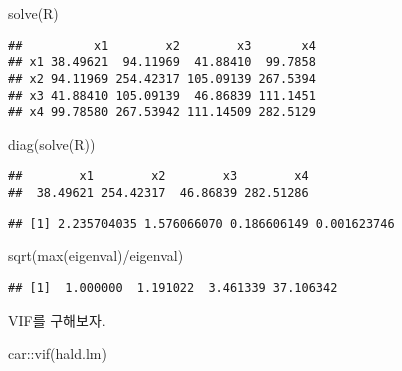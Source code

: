 \documentclass[
]{book}
\newenvironment{Shaded}{\begin{snugshade}}{\end{snugshade}}
\newcommand{\FunctionTok}[1]{\textcolor[rgb]{0.00,0.00,0.00}{#1}}
\newcommand{\NormalTok}[1]{#1}
\newcommand{\OtherTok}[1]{\textcolor[rgb]{0.56,0.35,0.01}{#1}}
\newcommand{\SpecialCharTok}[1]{\textcolor[rgb]{0.00,0.00,0.00}{#1}}
\begin{document}
\begin{Shaded}
\begin{Highlighting}[]
\FunctionTok{solve}\NormalTok{(R)}
\end{Highlighting}
\end{Shaded}

\begin{verbatim}
##          x1        x2        x3       x4
## x1 38.49621  94.11969  41.88410  99.7858
## x2 94.11969 254.42317 105.09139 267.5394
## x3 41.88410 105.09139  46.86839 111.1451
## x4 99.78580 267.53942 111.14509 282.5129
\end{verbatim}

\begin{Shaded}
\begin{Highlighting}[]
\FunctionTok{diag}\NormalTok{(}\FunctionTok{solve}\NormalTok{(R))}
\end{Highlighting}
\end{Shaded}

\begin{verbatim}
##        x1        x2        x3        x4 
##  38.49621 254.42317  46.86839 282.51286
\end{verbatim}

\begin{Shaded}
\end{Shaded}

\begin{verbatim}
## [1] 2.235704035 1.576066070 0.186606149 0.001623746
\end{verbatim}

\begin{Shaded}
\begin{Highlighting}[]
\FunctionTok{sqrt}\NormalTok{(}\FunctionTok{max}\NormalTok{(eigenval)}\SpecialCharTok{/}\NormalTok{eigenval)}
\end{Highlighting}
\end{Shaded}

\begin{verbatim}
## [1]  1.000000  1.191022  3.461339 37.106342
\end{verbatim}

VIF를 구해보자.

\begin{Shaded}
\begin{Highlighting}[]
\NormalTok{car}\SpecialCharTok{::}\FunctionTok{vif}\NormalTok{(hald.lm)}
\end{Highlighting}
\end{Shaded}
\end{document}
